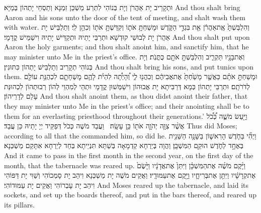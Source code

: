 {וּתְקָרֵיב יָת אַהֲרֹן וְיָת בְּנוֹהִי לִתְרַע מַשְׁכַּן זִמְנָא וְתַסְחֵי יָתְהוֹן בְּמַיָּא׃}
{And thou shalt bring Aaron and his sons unto the door of the tent of meeting, and shalt wash them with water.}{}
{וְהִלְבַּשְׁתָּ֙ אֶֽת\maqqaf אַהֲרֹ֔ן אֵ֖ת בִּגְדֵ֣י הַקֹּ֑דֶשׁ וּמָשַׁחְתָּ֥ אֹת֛וֹ וְקִדַּשְׁתָּ֥ אֹת֖וֹ וְכִהֵ֥ן לִֽי׃}
{וְתַלְבֵּישׁ יָת אַהֲרֹן יָת לְבוּשֵׁי קוּדְשָׁא וּתְרַבֵּי יָתֵיהּ וּתְקַדֵּישׁ יָתֵיהּ וִישַׁמֵּישׁ קֳדָמָי׃}
{And thou shalt put upon Aaron the holy garments; and thou shalt anoint him, and sanctify him, that he may minister unto Me in the priest’s office.}{}
{וְאֶת\maqqaf בָּנָ֖יו תַּקְרִ֑יב וְהִלְבַּשְׁתָּ֥ אֹתָ֖ם כֻּתֳּנֹֽת׃}
{וְיָת בְּנוֹהִי תְקָרֵיב וְתַלְבֵּישׁ יָתְהוֹן כִּתּוּנִין׃}
{And thou shalt bring his sons, and put tunics upon them.}{}
{וּמָשַׁחְתָּ֣ אֹתָ֗ם כַּאֲשֶׁ֤ר מָשַׁ֙חְתָּ֙ אֶת\maqqaf אֲבִיהֶ֔ם וְכִהֲנ֖וּ לִ֑י וְ֠הָיְתָ֠ה לִהְיֹ֨ת לָהֶ֧ם מׇשְׁחָתָ֛ם לִכְהֻנַּ֥ת עוֹלָ֖ם לְדֹרֹתָֽם׃}
{וּתְרַבֵּי יָתְהוֹן כְּמָא דְּרַבִּיתָא יָת אֲבוּהוֹן וִישַׁמְּשׁוּן קֳדָמָי וּתְהֵי לְמִהְוֵי לְהוֹן רְבוּתְהוֹן לִכְהוּנַּת עָלַם לְדָרֵיהוֹן׃}
{And thou shalt anoint them, as thou didst anoint their father, that they may minister unto Me in the priest’s office; and their anointing shall be to them for an everlasting priesthood throughout their generations.’}{}
{וַיַּ֖עַשׂ מֹשֶׁ֑ה כְּ֠כֹ֠ל אֲשֶׁ֨ר צִוָּ֧ה יְהֹוָ֛ה אֹת֖וֹ כֵּ֥ן עָשָֽׂה׃ \setuma }
{וַעֲבַד מֹשֶׁה כְּכֹל דְּפַקֵּיד יְיָ יָתֵיהּ כֵּן עֲבַד׃}
{Thus did Moses; according to all that the \lord\space commanded him, so did he.}{}
{וַיְהִ֞י בַּחֹ֧דֶשׁ הָרִאשׁ֛וֹן בַּשָּׁנָ֥ה הַשֵּׁנִ֖ית בְּאֶחָ֣ד לַחֹ֑דֶשׁ הוּקַ֖ם הַמִּשְׁכָּֽן׃}
{וַהֲוָה בְּיַרְחָא קַדְמָאָה בְּשַׁתָּא תִּנְיֵיתָא בְּחַד לְיַרְחָא אִתָּקַם מַשְׁכְּנָא׃}
{And it came to pass in the first month in the second year, on the first day of the month, that the tabernacle was reared up.}{}
{וַיָּ֨קֶם מֹשֶׁ֜ה אֶת\maqqaf הַמִּשְׁכָּ֗ן וַיִּתֵּן֙ אֶת\maqqaf אֲדָנָ֔יו וַיָּ֙שֶׂם֙ אֶת\maqqaf קְרָשָׁ֔יו וַיִּתֵּ֖ן אֶת\maqqaf בְּרִיחָ֑יו וַיָּ֖קֶם אֶת\maqqaf עַמּוּדָֽיו׃}
{וַאֲקֵים מֹשֶׁה יָת מַשְׁכְּנָא וִיהַב יָת סָמְכוֹהִי וְשַׁוִּי יָת דַּפּוֹהִי וִיהַב יָת עָבְרוֹהִי וַאֲקֵים יָת עַמּוּדוֹהִי׃}
{And Moses reared up the tabernacle, and laid its sockets, and set up the boards thereof, and put in the bars thereof, and reared up its pillars.}{}
